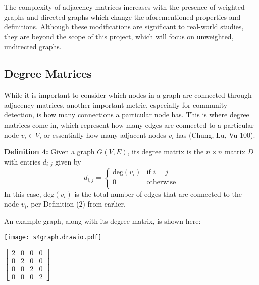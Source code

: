 \documentclass{article}
\begin{document}
\bigskip 

The complexity of adjacency matrices increases with the presence of weighted graphs and directed graphs which change the aforementioned properties and definitions. 
Although these modifications are significant to real-world studies, they are beyond the scope of this project, which will focus on unweighted, undirected graphs.


\bigskip 


\subsection*{Degree Matrices}

\bigskip

While it is important to consider which nodes in a graph are connected through adjacency matrices, another important metric, especially for community detection, is how many connections a particular node has.
This is where degree matrices come in, which represent how many edges are connected to a particular node $v_i \in V$, or essentially how many adjacent nodes $v_i$ has (Chung, Lu, Vu 100).

\bigskip 

\textbf{Definition 4:} Given a graph $G(V, E)$, its degree matrix is the $n \times n$ matrix $D$ with entries $d_{i,j}$ given by
\[   
d_{i,j} = 
     \begin{cases}
       \text{deg} (v_i) & \text{if } i = j \\
       0 & \text{otherwise} \\
     \end{cases}
\]
In this case, deg$(v_i)$ is the total number of edges that are connected to the node $v_i$, per Definition (2) from earlier.

\bigskip 

An example graph, along with its degree matrix, is shown here:

\bigskip

\noindent\begin{minipage}{.5\textwidth}
\centering
\texttt{[image: s4graph.drawio.pdf]}
\label{fig:fig3}            
\end{minipage}%
\begin{minipage}{.5\textwidth}
\centering
\vspace{1cm}
 $\begin{bmatrix}
2 & 0 & 0 & 0\\
0 & 2 & 0 & 0\\
0 & 0 & 2 & 0\\
0 & 0 & 0 & 2
\end{bmatrix}$
\vspace{0.88cm}

\label{fig:fig4}            
\end{minipage}
\end{document}
